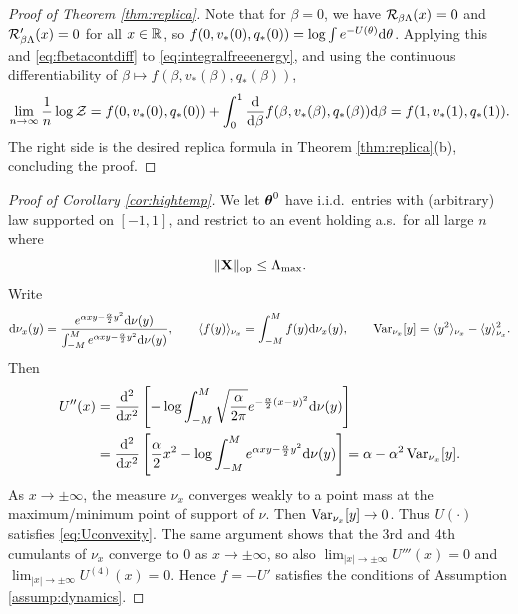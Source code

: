 \begin{proof}[Proof of Theorem \ref{thm:replica}]
Note that for $\beta=0$, we have $\mathcal{R}_{\beta\Lambda}(x)=0$
and $\mathcal{R}_{\beta\Lambda}'(x)=0$ for all $x \in \mathbb{R}$, so
$f(0,v_*(0),q_*(0))=\log \int e^{-U(\theta)}\mathrm{d}\theta$.
Applying this and \eqref{eq:fbetacontdiff} to \eqref{eq:integralfreeenergy}, and
using the continuous differentiability of $\beta \mapsto f(\beta,v_*(\beta),q_*(\beta))$,
\[\lim_{n \to \infty} \frac{1}{n}\log \mathcal{Z}
=f(0,v_*(0),q_*(0))
+\int_0^1 \frac{\mathrm{d}}{\mathrm{d} \beta} f(\beta,v_*(\beta),q_*(\beta))\mathrm{d} \beta
=f(1,v_*(1),q_*(1)).\]
The right side is the desired replica formula in Theorem
\ref{thm:replica}(b), concluding the proof.
\end{proof}

\begin{proof}[Proof of Corollary \ref{cor:hightemp}]
We let $\boldsymbol{\theta}^0$ have i.i.d.\ entries with (arbitrary) law supported on $[-1,1]$, and restrict to an event holding a.s.\ for all large $n$ where
\[\|\mathbf{X}\|_{\mathrm{op}} \leq \Lambda_{\max}.\]
Write
\[\mathrm{d} \nu_x(y)=\frac{e^{\alpha xy-\frac{\alpha}{2}y^2}\mathrm{d} \nu(y)}
{\int_{-M}^M e^{\alpha xy-\frac{\alpha}{2}y^2}\mathrm{d} \nu(y)},
\qquad \langle f(y) \rangle_{\nu_x}=\int_{-M}^M f(y) \mathrm{d} \nu_x(y),
\qquad \operatorname{Var}_{\nu_x}[y]=\langle y^2 \rangle_{\nu_x}
-\langle y \rangle_{\nu_x}^2.\]
Then
\begin{align*}
U''(x)&=\frac{\mathrm{d}^2}{\mathrm{d} x^2}\left[-\log
\int_{-M}^M \sqrt{\frac{\alpha}{2\pi}}e^{-\frac{\alpha}{2}(x-y)^2}\mathrm{d}
\nu(y)\right]\\
&=\frac{\mathrm{d}^2}{\mathrm{d} x^2}\left[\frac{\alpha}{2}x^2-\log \int_{-M}^M
e^{\alpha xy-\frac{\alpha}{2}y^2} \mathrm{d} \nu(y)\right]
=\alpha-\alpha^2\operatorname{Var}_{\nu_x}[y].
\end{align*}
As $x \to \pm\infty$, the measure $\nu_x$ converges weakly to a point mass
at the maximum/minimum point of support of $\nu$. Then $\operatorname{Var}_{\nu_x}[y] \to 0$.
Thus $U(\cdot)$ satisfies
\eqref{eq:Uconvexity}. The same argument shows that the 3rd and 4th cumulants of $\nu_x$
converge to 0 as $x \to \pm \infty$, so also
$\lim_{|x| \to \pm \infty} U'''(x)=0$ and $\lim_{|x| \to \pm \infty} U^{(4)}(x)=0$. Hence $f={-}U'$ satisfies the conditions
of Assumption \ref{assump:dynamics}.


\end{proof}
